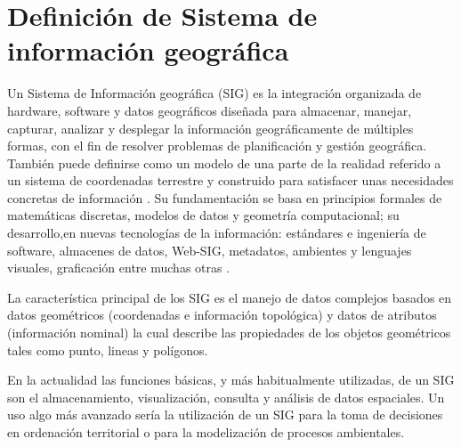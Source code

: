 \section{Definición de Sistema de información geográfica}
\label{sec:cap2-definicion-sig}

Un Sistema de Información geográfica (SIG) es la integración organizada de hardware, software y datos geográficos
diseñada para almacenar, manejar, capturar, analizar y desplegar la información geográficamente de múltiples
formas, con el fin de resolver problemas de planificación y gestión geográfica. También puede definirse como un
modelo de una parte de la realidad referido a un sistema de coordenadas terrestre y construido para satisfacer 
unas necesidades concretas de información \cite{lopezMarcos2007}. Su fundamentación se basa en principios formales
de matemáticas discretas, modelos de datos y geometría computacional; su desarrollo,en nuevas tecnologías de la
información: estándares e ingeniería de software, almacenes de datos, Web-SIG, metadatos, ambientes y lenguajes
visuales, graficación entre muchas otras \cite{lunaPaulina2010}.

La característica principal de los SIG es el manejo de datos complejos basados en datos geométricos (coordenadas e
información topológica) y datos de atributos (información nominal) la cual describe las propiedades de los objetos
geométricos tales como punto, lineas y polígonos.

En la actualidad las funciones básicas, y más habitualmente utilizadas, de un SIG son el almacenamiento,
visualización, consulta y análisis de datos espaciales. Un uso algo más avanzado sería la utilización 
de un SIG para la toma de decisiones en ordenación territorial o para la modelización de procesos ambientales.

